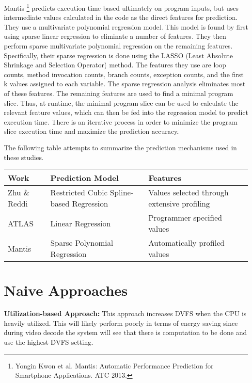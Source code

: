 \documentclass[11pt, letterpaper]{article}
\begin{document}
Mantis \footnote{Yongin Kwon et al. Mantis: Automatic Performance Prediction
for Smartphone Applications. ATC 2013.} predicts execution time based
ultimately on program inputs, but uses
intermediate values calculated in the code as the direct features for
prediction. They use a multivariate polynomial regression model. This model is
found by first using sparse linear regression to eliminate a number of
features. They then perform sparse multivariate polynomial regression on the
remaining features. Specifically, their sparse regression is done using the
LASSO (Least Absolute Shrinkage and Selection Operator) method. The features
they use are loop counts, method invocation counts, branch counts, exception
counts, and the first k values assigned to each variable. The sparse regression
analysis eliminates most of these features. The remaining features are used to
find a minimal program slice. Thus, at runtime, the minimal program slice can
be used to calculate the relevant feature values, which can then be fed into
the regression model to predict execution time. There is an iterative process
in order to minimize the program slice execution time and maximize the
prediction accuracy.

The following table attempts to summarize the prediction mechanisms used in these studies.

\noindent
\begin{small}
\begin{tabular}{|l||l|l|}
\hline
Work & Prediction Model & Features \\\hline\hline

Zhu \& Reddi & Restricted Cubic Spline-based Regression & Values selected through extensive profiling \\ \hline
ATLAS & Linear Regression & Programmer specified values \\ \hline
Mantis & Sparse Polynomial Regression & Automatically profiled values \\ \hline
\end{tabular}
\end{small}

\section{Naive Approaches}

\textbf{Utilization-based Approach: } This approach increases DVFS when the CPU
is heavily utilized. This will likely perform poorly in terms of energy saving
since during video decode the system will see that there is computation to be
done and use the highest DVFS setting.
\end{document}

